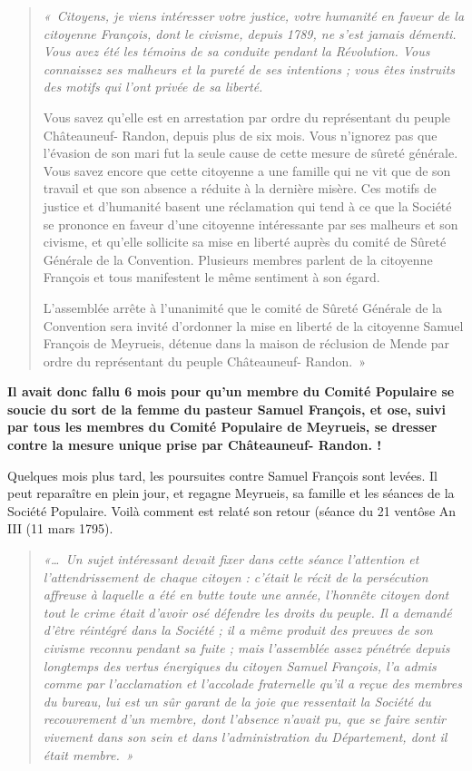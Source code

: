 \begin{quote}
\itshape
«~Citoyens, je viens intéresser votre justice, votre humanité en faveur de la citoyenne
François, dont le civisme, depuis 1789, ne s’est jamais démenti. Vous avez été les témoins de
sa conduite pendant la Révolution. Vous connaissez ses malheurs et la pureté de ses
intentions ; vous êtes instruits des motifs qui l’ont privée de sa liberté.

Vous savez qu’elle est en arrestation par ordre du représentant du peuple Châteauneuf-
Randon, depuis plus de six mois. Vous n’ignorez pas que l’évasion de son mari fut la seule
cause de cette mesure de sûreté générale. Vous savez encore que cette citoyenne a une
famille qui ne vit que de son travail et que son absence a réduite à la dernière misère. Ces
motifs de justice et d’humanité basent une réclamation qui tend à ce que la Société se
prononce en faveur d’une citoyenne intéressante par ses malheurs et son civisme, et qu’elle
sollicite sa mise en liberté auprès du comité de Sûreté Générale de la Convention. Plusieurs
membres parlent de la citoyenne François et tous manifestent le même sentiment à son égard.

L’assemblée arrête à l’unanimité que le comité de Sûreté Générale de la Convention sera
invité d’ordonner la mise en liberté de la citoyenne Samuel François de Meyrueis, détenue
dans la maison de réclusion de Mende par ordre du représentant du peuple Châteauneuf-
Randon.~»
\end{quote}

\textbf{Il avait donc fallu 6 mois pour qu’un membre du Comité Populaire se soucie du sort de
la femme du pasteur Samuel François, et ose, suivi par tous les membres du Comité
Populaire de Meyrueis, se dresser contre la mesure unique prise par Châteauneuf-
Randon. !}

Quelques mois plus tard, les poursuites contre Samuel François sont levées. Il peut reparaître
en plein jour, et regagne Meyrueis, sa famille et les séances de la Société Populaire. Voilà
comment est relaté son retour (séance du 21 ventôse An III (11 mars 1795).

\begin{quote}
\itshape
«\ldots\ Un sujet intéressant devait fixer dans cette séance l’attention et l’attendrissement de
chaque citoyen : c’était le récit de la persécution affreuse à laquelle a été en butte toute une
année, l’honnête citoyen dont tout le crime était d’avoir osé défendre les droits du peuple. Il a
demandé d’être réintégré dans la Société ; il a même produit des preuves de son civisme
reconnu pendant sa fuite ; mais l’assemblée assez pénétrée depuis longtemps des vertus
énergiques du citoyen Samuel François, l’a admis comme par l’acclamation et l’accolade
fraternelle qu’il a reçue des membres du bureau, lui est un sûr garant de la joie que ressentait
la Société du recouvrement d’un membre, dont l’absence n’avait pu, que se faire sentir
vivement dans son sein et dans l’administration du Département, dont il était membre.~»
\end{quote}

